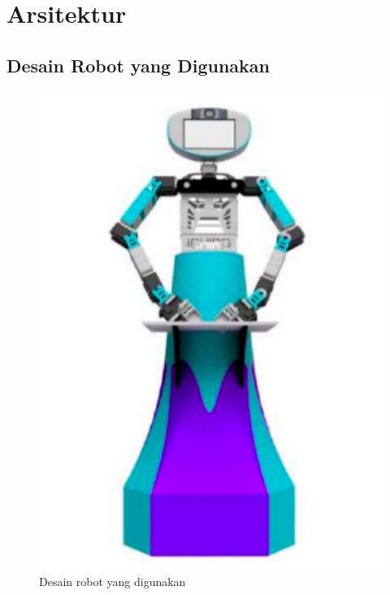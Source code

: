 \section{Arsitektur}
\label{sec:arsitektur}

\subsection{Desain Robot yang Digunakan}

\begin{figure} [ht]
  \centering
  \includegraphics[scale=0.4]{gambar/desainrobot.png}
  \caption{Desain robot yang digunakan}
  \label{fig:desainrobot}
\end{figure}

